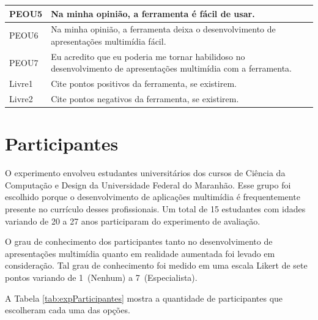 \documentclass[../main.tex]{subfiles}
\begin{document}
\begin{table}[htpb]
\begin{tabularx}{.95\linewidth}{m{1.3cm} X}
PEOU5 & Na minha opinião, a ferramenta é fácil de usar.
\\\midrule
PEOU6 & Na minha opinião, a ferramenta deixa o desenvolvimento de apresentações multimídia fácil.
\\\midrule
PEOU7 & Eu acredito que eu poderia me tornar habilidoso no desenvolvimento de apresentações multimídia com a ferramenta.
\\\midrule
Livre1 & Cite pontos positivos da ferramenta, se existirem.
\\\midrule
Livre2 & Cite pontos negativos da ferramenta, se existirem.
\\\bottomrule
\end{tabularx}
\end{table}

\section{Participantes}
\label{sec:participantes}

O experimento envolveu estudantes universitários dos cursos de Ciência da Com\-pu\-ta\-ção e Design da Universidade Federal do Maranhão. Esse grupo foi escolhido porque o desenvolvimento de aplicações multimídia é frequentemente presente no currículo desses profissionais. Um total de 15 estudantes com idades variando de 20 a 27 anos participaram do experimento de avaliação.

O grau de conhecimento dos participantes tanto no desenvolvimento de apresentações multimídia quanto em realidade aumentada foi levado em consideração. Tal grau de conhecimento foi medido em uma escala Likert de sete pontos variando de 1~(Nenhum) a 7~(Especialista).

A Tabela \ref{tab:expParticipantes} mostra a quantidade de participantes que escolheram cada uma das opções.
\end{document}
